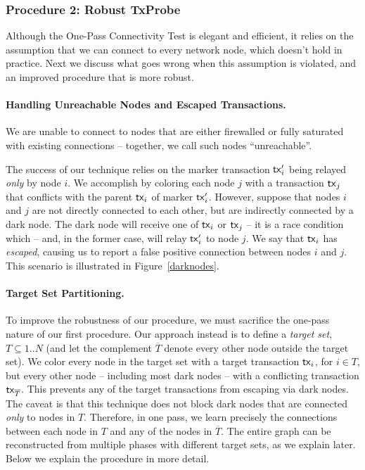 \subsubsection{Procedure 2: Robust TxProbe}

Although the One-Pass Connectivity Test is elegant and efficient, it relies on the assumption that we can connect to every network node, which doesn't hold in practice. Next we discuss what goes wrong when this assumption is violated, and an improved procedure that is more robust.

\paragraph{Handling Unreachable Nodes and Escaped Transactions.}
We are unable to connect to nodes that are either firewalled or fully saturated with existing connections -- together, we call such nodes ``unreachable''.

The success of our technique relies on the marker transaction $\textnormal{\textsf{tx}}'_i$ being relayed \emph{only} by node $i$. We accomplish by coloring each node $j$ with a transaction $\textnormal{\textsf{tx}}_j$ that conflicts with the parent $\textnormal{\textsf{tx}}_i$ of marker $\textnormal{\textsf{tx}}'_i$. However, suppose that nodes $i$ and $j$ are not directly connected to each other, but are indirectly connected by a dark node. The dark node will receive one of $\textnormal{\textsf{tx}}_i$ or $\textnormal{\textsf{tx}}_j$ -- it is a race condition which -- and, in the former case, will relay $\textnormal{\textsf{tx}}'_i$ to node $j$. We say that $\textnormal{\textsf{tx}}_i$ has \emph{escaped}, causing us to report a false positive connection between nodes $i$ and $j$. This scenario is illustrated in Figure~\ref{darknodes}.

\paragraph{Target Set Partitioning.}
To improve the robustness of our procedure, we must sacrifice the one-pass nature of our first procedure. Our approach instead is to define a \emph{target set}, $T \subseteq 1..N$ (and let the complement $\overline{T}$ denote every other node outside the target set). We color every node in the target set with a target transaction $\textnormal{\textsf{tx}}_i$, for $i \in T$, but every other node -- including most dark nodes -- with a conflicting transaction $\textnormal{\textsf{tx}}_{\overline{T}}$. This prevents any of the target transactions from escaping via dark nodes. The caveat is that this technique does not block dark nodes that are connected \emph{only} to nodes in $T$. Therefore, in one pass, we learn precisely the connections between each node in $T$ and any of the nodes in $\overline{T}$. The entire graph can be reconstructed from multiple phases with different target sets, as we explain later. Below we explain the procedure in more detail.

